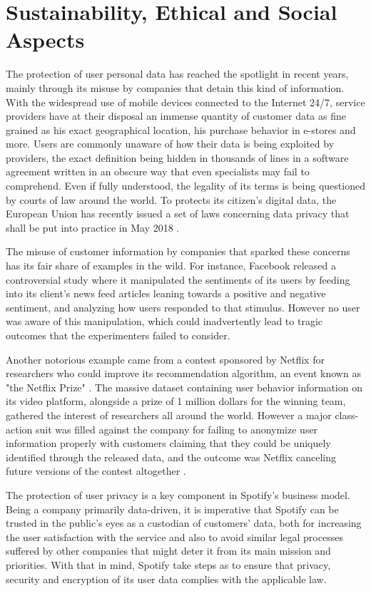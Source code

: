 \documentclass{kththesis}
\begin{document}
\section{Sustainability, Ethical and Social Aspects}

The protection of user personal data has reached the spotlight in recent years, mainly through its misuse by companies that detain this kind of information. With the widespread use of mobile devices connected to the Internet 24/7, service providers have at their disposal an immense quantity of customer data as fine grained as his exact geographical location, his purchase behavior in e-stores and more. Users are commonly unaware of how their data is being exploited by providers, the exact definition being hidden in thousands of lines in a software agreement written in an obscure way that even specialists may fail to comprehend. Even if fully understood, the legality of its terms is being questioned by courts of law around the world. To protects its citizen's digital data, the European Union has recently issued a set of laws concerning data privacy that shall be put into practice in May 2018 \citep{eu2017protection}.

The misuse of customer information by companies that sparked these concerns has its fair share of examples in the wild. For instance, Facebook released a controversial study where it manipulated the sentiments of its users by feeding into its client's news feed articles leaning towards a positive and negative sentiment, and analyzing how users responded to that stimulus\citep{kramer2014experimental}. However no user was aware of this manipulation, which could inadvertently lead to tragic outcomes that the experimenters failed to consider. 

Another notorious example came from a contest sponsored by Netflix for researchers who could improve its recommendation algorithm, an event known as "the Netflix Prize" \citep{bennett2007netflix}. The massive dataset containing user behavior information on its video platform, alongside a prize of 1 million dollars for the winning team, gathered the interest of researchers all around the world. However a major class-action suit was filled against the company for failing to anonymize user information properly with customers claiming that they could be uniquely identified through the released data, and the outcome was Netflix canceling future versions of the contest altogether \citep{wired2010netflix}.

The protection of user privacy is a key component in Spotify's business model. Being a company primarily data-driven, it is imperative that Spotify can be trusted in the public's eyes as a custodian of customers' data, both for increasing the user satisfaction with the service and also to avoid similar legal processes suffered by other companies that might deter it from its main mission and priorities. With that in mind, Spotify take steps as to ensure that privacy, security and encryption of its user data complies with the applicable law. 
\end{document}
